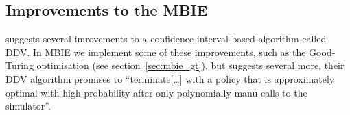 \subsection{Improvements to the MBIE}

\textcite{dietterich2013pac} suggests several imrovements to a confidence interval based algorithm called DDV. In MBIE we implement some of these improvements, such as the Good-Turing optimisation (see section~\ref{sec:mbie_gt}), but \textcite{dietterich2013pac} suggests several more, their DDV algorithm promises to ``terminate[\ldots] with a policy that is approximately optimal with high probability after only polynomially manu calls to the simulator''.
